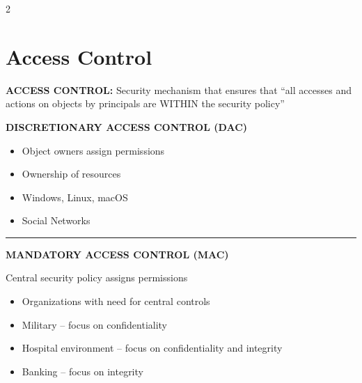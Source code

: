 \documentclass[a4paper,9pt]{extarticle}
\newcommand{\separator}{
\vspace{2pt}
\hrule
\vspace{3pt}
}
\begin{document}

\thispagestyle{fancy}



\begin{multicols}{2}


\section{Access Control}


\begin{definition}

\textbf{ACCESS CONTROL:} Security mechanism that ensures that
``all accesses and actions on objects by principals are WITHIN the security policy''

\end{definition}


\textbf{DISCRETIONARY ACCESS CONTROL (DAC)}

\begin{itemize}

\item Object owners assign permissions

\item Ownership of resources

\item Windows, Linux, macOS

\item Social Networks

\end{itemize}


\separator


\textbf{MANDATORY ACCESS CONTROL (MAC)}

Central security policy assigns permissions

\begin{itemize}

\item Organizations with need for central controls

\item Military -- focus on confidentiality

\item Hospital environment -- focus on confidentiality
and integrity

\item Banking -- focus on integrity

\end{itemize}




\end{multicols}
\end{document}
